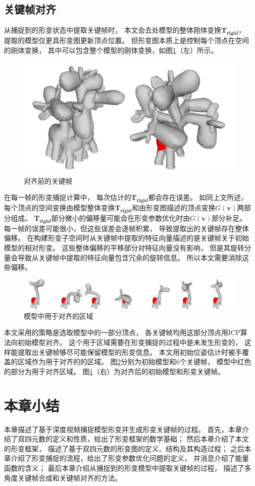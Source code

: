 \subsection{关键帧对齐}
从捕捉到的形变状态中提取关键帧时，
本文会去处模型的整体刚体变换$\bm{T_{rigid}}$，
提取的模型仅更具形变图更新顶点位置。
但形变图本质上是控制每个顶点在空间的刚体变换，
其中可以包含整个模型的刚体变换，如图\ref{before_after_align}（左）所示。
\begin{figure}
    \centering
    \includegraphics[width = \textwidth]{./Pictures/before_after_align.png}
    \caption{对齐前的关键帧}
    \label{before_after_align}
\end{figure}

在每一帧的形变捕捉计算中，
每次估计的$\bm{T_{rigid}}$都会存在误差。
如同上文所述，
每个顶点的空间变换由模型整体变换$\bm{T_{rigid}}$和由形变图描述的顶点变换$G(\bm{v})$两部分组成。
$\bm{T_{rigid}}$部分微小的偏移量可能会在形变参数优化时由$G(\bm{v})$部分补足。
每一帧的误差可能很小，但这些误差会逐帧积累，
导致提取出的关键帧存在整体偏移。
在构建形变子空间时从关键帧中提取的特征向量描述的是关键帧关于初始模型的相对形变。
这些整体偏移的平移部分对特征向量没有影响，
但是其旋转分量会导致从关键帧中提取的特征向量包含冗余的旋转信息。
所以本文需要消除这些偏移。
\begin{figure}
    \centering
    \includegraphics[width = \textwidth]{./Pictures/align_area.png}
    \caption{模型中用于对齐的区域}
    \label{align_area}
\end{figure}
本文采用的策略是选取模型中的一部分顶点，
各关键帧均用这部分顶点用ICP算法向初始模型对齐。
这个用于区域需要在形变捕捉的过程中是未发生形变的，
这样能提取出关键帧够尽可能保留模型的形变信息。
本文用初始位姿估计时被手覆盖的区域作为用于对齐的的区域。
图\ref{align_area}分别为初始模型和6个关键帧，
模型中红色的部分为用于对齐区域。
图\ref{before_after_align}（右）为对齐后的初始模型和形变关键帧。
\section{本章小结}
本章描述了基于深度视频捕捉模型形变并生成形变关键帧的过程。
首先，本章介绍了双四元数的定义和性质，给出了形变框架的数学基础；
然后本章介绍了本文的形变框架，
描述了基于双四元数的形变图的定义、结构及其构造过程；
之后本章介绍了形变捕捉的流程，给出了形变参数优化问题的定义，
并消息介绍了能量函数的含义；
最后本章介绍从捕捉到的形变模型中提取关键帧的过程，
描述了多角度关键帧合成和关键帧对齐的方法。
